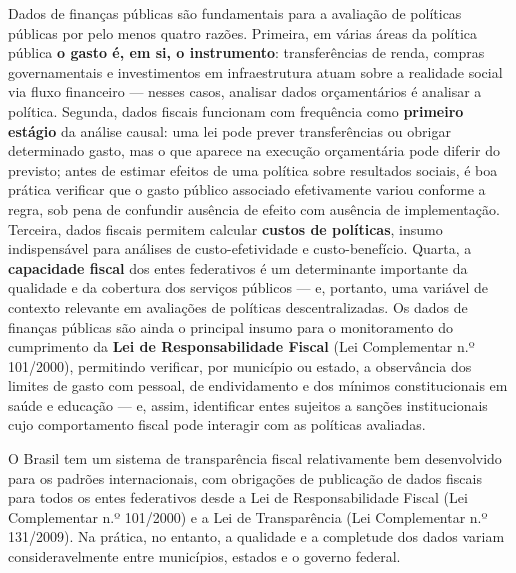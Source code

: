 Dados de finanças públicas são fundamentais para a avaliação de políticas públicas por pelo menos quatro razões. Primeira, em várias áreas da política pública \textbf{o gasto é, em si, o instrumento}: transferências de renda, compras governamentais e investimentos em infraestrutura atuam sobre a realidade social via fluxo financeiro --- nesses casos, analisar dados orçamentários é analisar a política. Segunda, dados fiscais funcionam com frequência como \textbf{primeiro estágio} da análise causal: uma lei pode prever transferências ou obrigar determinado gasto, mas o que aparece na execução orçamentária pode diferir do previsto; antes de estimar efeitos de uma política sobre resultados sociais, é boa prática verificar que o gasto público associado efetivamente variou conforme a regra, sob pena de confundir ausência de efeito com ausência de implementação. Terceira, dados fiscais permitem calcular \textbf{custos de políticas}, insumo indispensável para análises de custo-efetividade e custo-benefício. Quarta, a \textbf{capacidade fiscal} dos entes federativos é um determinante importante da qualidade e da cobertura dos serviços públicos --- e, portanto, uma variável de contexto relevante em avaliações de políticas descentralizadas. Os dados de finanças públicas são ainda o principal insumo para o monitoramento do cumprimento da \textbf{Lei de Responsabilidade Fiscal} (Lei Complementar n.º 101/2000), permitindo verificar, por município ou estado, a observância dos limites de gasto com pessoal, de endividamento e dos mínimos constitucionais em saúde e educação --- e, assim, identificar entes sujeitos a sanções institucionais cujo comportamento fiscal pode interagir com as políticas avaliadas.

O Brasil tem um sistema de transparência fiscal relativamente bem desenvolvido para os padrões internacionais, com obrigações de publicação de dados fiscais para todos os entes federativos desde a Lei de Responsabilidade Fiscal (Lei Complementar n.º 101/2000) e a Lei de Transparência (Lei Complementar n.º 131/2009). Na prática, no entanto, a qualidade e a completude dos dados variam consideravelmente entre municípios, estados e o governo federal.


